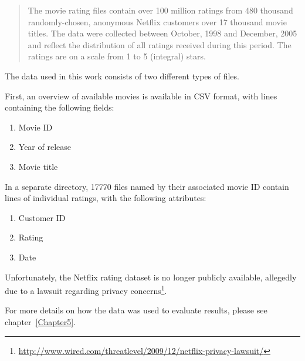 \begin{quote}
  The movie rating files contain over 100 million ratings from 480 thousand
  randomly-chosen, anonymous Netflix customers over 17 thousand movie titles.  The
  data were collected between October, 1998 and December, 2005 and reflect the
  distribution of all ratings received during this period.  The ratings are on a
  scale from 1 to 5 (integral) stars.
\end{quote}

The data used in this work consists of two different types of files.

First, an overview of available movies is available in CSV format, with lines containing the following fields:

\begin{enumerate}
  \item Movie ID
  \item Year of release
  \item Movie title
\end{enumerate}

In a separate directory, 17770 files named by their associated movie ID contain lines of individual ratings, with the following attributes:

\begin{enumerate}
  \item Customer ID
  \item Rating
  \item Date
\end{enumerate}

Unfortunately, the Netflix rating dataset is no longer publicly available, allegedly due to a lawsuit regarding privacy concerns\footnote{\url{http://www.wired.com/threatlevel/2009/12/netflix-privacy-lawsuit/}}.

For more details on how the data was used to evaluate results, please see chapter~\ref{Chapter5}.

